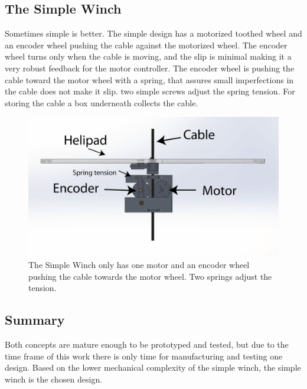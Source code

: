 
\subsection{The Simple Winch}
Sometimes simple is better. The simple design has a motorized toothed wheel and an encoder wheel pushing the cable against the motorized wheel. The encoder wheel turns only when the cable is moving, and the slip is minimal making it a very robust feedback for the motor controller. The encoder wheel is pushing the cable toward the motor wheel with a spring, that assures small imperfections in the cable does not make it slip. two simple screws adjust the spring tension. For storing the cable a box underneath collects the cable.

\begin{figure}[H]
\centering
\includegraphics[scale=0.75]{graphics/cad/winch.png}
\caption[The Simple Winch]{The Simple Winch only has one motor and an encoder wheel pushing the cable towards the motor wheel. Two springs adjust the tension.}
\label{fig:winch}
\end{figure}

\subsection{Summary}
Both concepts are mature enough to be prototyped and tested, but due to the time frame of this work there is only time for manufacturing and testing one design. Based on the lower mechanical complexity of the simple winch, the simple winch is the chosen design.    


